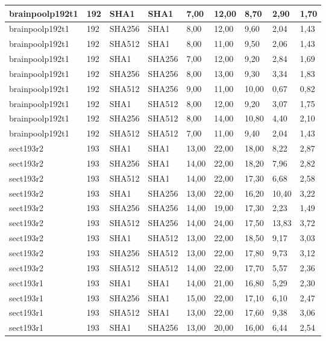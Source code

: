 \begin{longtable}{| l | l | l | l | l |l |l |l |l |}
brainpoolp192t1 & 192 & SHA1 & SHA1 & 7,00 & 12,00 & 8,70 & 2,90 & 1,70 \\ \hline 
brainpoolp192t1 & 192 & SHA256 & SHA1 & 8,00 & 12,00 & 9,60 & 2,04 & 1,43 \\ \hline 
brainpoolp192t1 & 192 & SHA512 & SHA1 & 8,00 & 11,00 & 9,50 & 2,06 & 1,43 \\ \hline 
brainpoolp192t1 & 192 & SHA1 & SHA256 & 7,00 & 12,00 & 9,20 & 2,84 & 1,69 \\ \hline 
brainpoolp192t1 & 192 & SHA256 & SHA256 & 8,00 & 13,00 & 9,30 & 3,34 & 1,83 \\ \hline 
brainpoolp192t1 & 192 & SHA512 & SHA256 & 9,00 & 11,00 & 10,00 & 0,67 & 0,82 \\ \hline 
brainpoolp192t1 & 192 & SHA1 & SHA512 & 8,00 & 12,00 & 9,20 & 3,07 & 1,75 \\ \hline 
brainpoolp192t1 & 192 & SHA256 & SHA512 & 8,00 & 14,00 & 10,80 & 4,40 & 2,10 \\ \hline 
brainpoolp192t1 & 192 & SHA512 & SHA512 & 7,00 & 11,00 & 9,40 & 2,04 & 1,43 \\ \hline 
sect193r2 & 193 & SHA1 & SHA1 & 13,00 & 22,00 & 18,00 & 8,22 & 2,87 \\ \hline 
sect193r2 & 193 & SHA256 & SHA1 & 14,00 & 22,00 & 18,20 & 7,96 & 2,82 \\ \hline 
sect193r2 & 193 & SHA512 & SHA1 & 14,00 & 22,00 & 17,30 & 6,68 & 2,58 \\ \hline 
sect193r2 & 193 & SHA1 & SHA256 & 13,00 & 22,00 & 16,20 & 10,40 & 3,22 \\ \hline 
sect193r2 & 193 & SHA256 & SHA256 & 14,00 & 19,00 & 17,30 & 2,23 & 1,49 \\ \hline 
sect193r2 & 193 & SHA512 & SHA256 & 14,00 & 24,00 & 17,50 & 13,83 & 3,72 \\ \hline 
sect193r2 & 193 & SHA1 & SHA512 & 13,00 & 22,00 & 18,50 & 9,17 & 3,03 \\ \hline 
sect193r2 & 193 & SHA256 & SHA512 & 13,00 & 22,00 & 17,80 & 9,73 & 3,12 \\ \hline 
sect193r2 & 193 & SHA512 & SHA512 & 14,00 & 22,00 & 17,70 & 5,57 & 2,36 \\ \hline 
sect193r1 & 193 & SHA1 & SHA1 & 14,00 & 21,00 & 16,80 & 5,29 & 2,30 \\ \hline 
sect193r1 & 193 & SHA256 & SHA1 & 15,00 & 22,00 & 17,10 & 6,10 & 2,47 \\ \hline 
sect193r1 & 193 & SHA512 & SHA1 & 13,00 & 22,00 & 17,60 & 9,38 & 3,06 \\ \hline 
sect193r1 & 193 & SHA1 & SHA256 & 13,00 & 20,00 & 16,00 & 6,44 & 2,54 \\ \hline 

\end{longtable}
